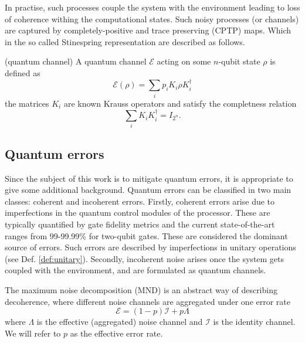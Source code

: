 In practise, such processes couple the system with the environment leading to loss of coherence withing the computational states.
Such noisy processes (or channels) are captured by completely-positive and trace preserving (CPTP) maps. Which in the so called Stinespring representation
are described as follows.

\begin{definition} (quantum channel)
\label{def:channel}
A quantum channel $\mathcal{E}$ acting on some $n$-qubit state $\rho$ is defined as
\begin{equation}
    \mathcal{E}(\rho) = \sum_i p_i K_i\rho K_i^\dagger
\end{equation}
the matrices $K_i$ are known Krauss operators and satisfy the completness relation
\begin{equation}
    \sum_i K_i K_i^\dagger = I_{2^n}.
\end{equation}
\end{definition}

\subsection{Quantum errors}
\label{sec:errors}

Since the subject of this work is to mitigate quantum errors, it is appropriate to give some additional background.
Quantum errors can be classified in two main classes: coherent and incoherent errors. Firstly, coherent errors arise due to
imperfections in the quantum control modules of the processor. These are typically quantified by gate fidelity metrics and
the current state-of-the-art ranges from 99-99.99\% for two-qubit gates. These are considered the dominant source of errors.
Such errors are described by imperfections in unitary operations (see Def. \ref{def:unitary}).
Secondly, incoherent noise arises once the system gets coupled with the environment, and are formulated as quantum channels.

The maximum noise decomposition (MND) is an abstract way of describing decoherence, where different noise channels are aggregated under one error rate
\begin{equation}
    \mathcal{E} = (1-p)\mathcal{I} + p \Lambda
\end{equation}
where $\Lambda$ is the effective (aggregated) noise channel and $\mathcal{I}$ is the identity channel. We will refer to $p$ as the effective error rate.


